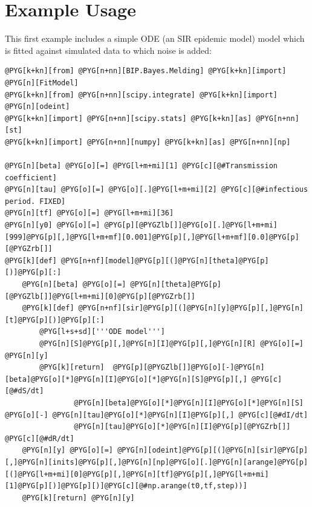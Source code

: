 \documentclass[a4paper,10pt,english]{manual}
\begin{document}
\section{Example Usage}

This first example includes a simple ODE (an SIR epidemic model) model which is fitted against simulated data to which noise is added:

\begin{Verbatim}[commandchars=@\[\]]
@PYG[k+kn][from] @PYG[n+nn][BIP.Bayes.Melding] @PYG[k+kn][import] @PYG[n][FitModel]
@PYG[k+kn][from] @PYG[n+nn][scipy.integrate] @PYG[k+kn][import] @PYG[n][odeint]
@PYG[k+kn][import] @PYG[n+nn][scipy.stats] @PYG[k+kn][as] @PYG[n+nn][st]
@PYG[k+kn][import] @PYG[n+nn][numpy] @PYG[k+kn][as] @PYG[n+nn][np]

@PYG[n][beta] @PYG[o][=] @PYG[l+m+mi][1] @PYG[c][@#Transmission coefficient]
@PYG[n][tau] @PYG[o][=] @PYG[o][.]@PYG[l+m+mi][2] @PYG[c][@#infectious period. FIXED]
@PYG[n][tf] @PYG[o][=] @PYG[l+m+mi][36]
@PYG[n][y0] @PYG[o][=] @PYG[p][@PYGZlb[]]@PYG[o][.]@PYG[l+m+mi][999]@PYG[p][,]@PYG[l+m+mf][0.001]@PYG[p][,]@PYG[l+m+mf][0.0]@PYG[p][@PYGZrb[]]
@PYG[k][def] @PYG[n+nf][model]@PYG[p][(]@PYG[n][theta]@PYG[p][)]@PYG[p][:]
    @PYG[n][beta] @PYG[o][=] @PYG[n][theta]@PYG[p][@PYGZlb[]]@PYG[l+m+mi][0]@PYG[p][@PYGZrb[]]
    @PYG[k][def] @PYG[n+nf][sir]@PYG[p][(]@PYG[n][y]@PYG[p][,]@PYG[n][t]@PYG[p][)]@PYG[p][:]
        @PYG[l+s+sd]['''ODE model''']
        @PYG[n][S]@PYG[p][,]@PYG[n][I]@PYG[p][,]@PYG[n][R] @PYG[o][=] @PYG[n][y]
        @PYG[k][return]  @PYG[p][@PYGZlb[]]@PYG[o][-]@PYG[n][beta]@PYG[o][*]@PYG[n][I]@PYG[o][*]@PYG[n][S]@PYG[p][,] @PYG[c][@#dS/dt]
                @PYG[n][beta]@PYG[o][*]@PYG[n][I]@PYG[o][*]@PYG[n][S] @PYG[o][-] @PYG[n][tau]@PYG[o][*]@PYG[n][I]@PYG[p][,] @PYG[c][@#dI/dt]
                @PYG[n][tau]@PYG[o][*]@PYG[n][I]@PYG[p][@PYGZrb[]] @PYG[c][@#dR/dt]
    @PYG[n][y] @PYG[o][=] @PYG[n][odeint]@PYG[p][(]@PYG[n][sir]@PYG[p][,]@PYG[n][inits]@PYG[p][,]@PYG[n][np]@PYG[o][.]@PYG[n][arange]@PYG[p][(]@PYG[l+m+mi][0]@PYG[p][,]@PYG[n][tf]@PYG[p][,]@PYG[l+m+mi][1]@PYG[p][)]@PYG[p][)]@PYG[c][@#np.arange(t0,tf,step))]
    @PYG[k][return] @PYG[n][y]


\end{Verbatim}
\end{document}
